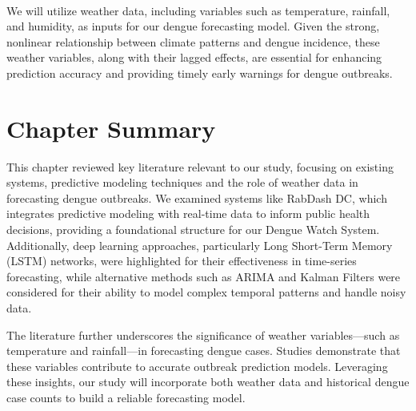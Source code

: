 \\ We will utilize weather data, including variables such as temperature, rainfall, and humidity, as inputs for our dengue forecasting model. Given the strong, nonlinear relationship between climate patterns and dengue incidence, these weather variables, along with their lagged effects, are essential for enhancing prediction accuracy and providing timely early warnings for dengue outbreaks.


\section{Chapter Summary}
This chapter reviewed key literature relevant to our study, focusing on existing systems, predictive modeling techniques and the role of weather data in forecasting dengue outbreaks. We examined systems like RabDash DC, which integrates predictive modeling with real-time data to inform public health decisions, providing a foundational structure for our Dengue Watch System. Additionally, deep learning approaches, particularly Long Short-Term Memory (LSTM) networks, were highlighted for their effectiveness in time-series forecasting, while alternative methods such as ARIMA and Kalman Filters were considered for their ability to model complex temporal patterns and handle noisy data.

The literature further underscores the significance of weather variables—such as temperature and rainfall—in forecasting dengue cases. Studies demonstrate that these variables contribute to accurate outbreak prediction models. Leveraging these insights, our study will incorporate both weather data and historical dengue case counts to build a reliable forecasting model.

